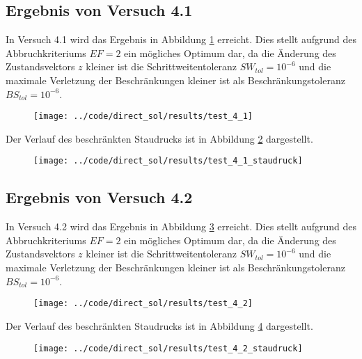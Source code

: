 \subsection{Ergebnis von Versuch 4.1}\label{kap:Versuch41}
In Versuch 4.1 wird das Ergebnis in Abbildung \ref{img:test_4_1} erreicht. Dies stellt aufgrund des Abbruchkriteriums $EF = 2$ ein mögliches Optimum dar, da die Änderung des Zustandsvektors $z$ kleiner ist die Schrittweitentoleranz $SW_{tol} = 10^{-6}$ und die maximale Verletzung der Beschränkungen kleiner ist als Beschränkungstoleranz $BS_{tol} = 10^{-6}$.
\begin{figure}[H]
\begin{center}
\texttt{[image: ../code/direct\_sol/results/test\_4\_1]}
 \label{img:test_4_1}
\end{center}
\end{figure}
Der Verlauf des beschränkten Staudrucks ist in Abbildung \ref{img:test_4_1_staudruck} dargestellt.
\begin{figure}[H]
\begin{center}
\texttt{[image: ../code/direct\_sol/results/test\_4\_1\_staudruck]}
 \label{img:test_4_1_staudruck}
\end{center}
\end{figure}




\subsection{Ergebnis von Versuch 4.2}\label{kap:Versuch42}
In Versuch 4.2 wird das Ergebnis in Abbildung \ref{img:test_4_2} erreicht. Dies stellt aufgrund des Abbruchkriteriums $EF = 2$ ein mögliches Optimum dar, da die Änderung des Zustandsvektors $z$ kleiner ist die Schrittweitentoleranz $SW_{tol} = 10^{-6}$ und die maximale Verletzung der Beschränkungen kleiner ist als Beschränkungstoleranz $BS_{tol} = 10^{-6}$.
\begin{figure}[H]
\begin{center}
\texttt{[image: ../code/direct\_sol/results/test\_4\_2]}
 \label{img:test_4_2}
\end{center}
\end{figure}
Der Verlauf des beschränkten Staudrucks ist in Abbildung \ref{img:test_4_2_staudruck} dargestellt.
\begin{figure}[H]
\begin{center}
\texttt{[image: ../code/direct\_sol/results/test\_4\_2\_staudruck]}
 \label{img:test_4_2_staudruck}
\end{center}
\end{figure}
